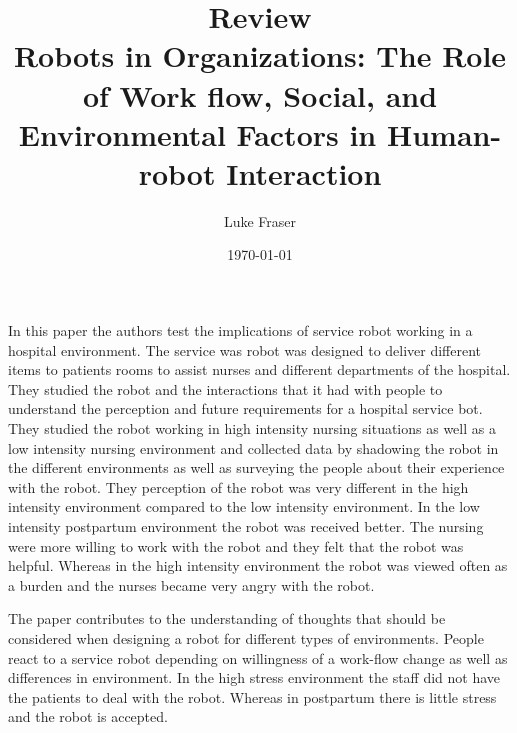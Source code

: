\documentclass{article}
\begin{document}
\title{{\large Review} \\ Robots in Organizations: The Role of Work flow, Social, and Environmental Factors in Human-robot Interaction}
\author{Luke Fraser}
\date{\today}
\maketitle

\begingroup
\renewcommand{\section}[2]{}


\endgroup

\section*{Summary}
In this paper the authors test the implications of service robot working in a hospital environment. The service was robot was designed to deliver different items to patients rooms to assist nurses and different departments of the hospital. They studied the robot and the interactions that it had with people to understand the perception and future requirements for a hospital service bot. They studied the robot working in high intensity nursing situations as well as a low intensity nursing environment and collected data by shadowing the robot in the different environments as well as surveying the people about their experience with the robot. They perception of the robot was very different in the high intensity environment compared to the low intensity environment. In the low intensity postpartum environment the robot was received better. The nursing were more willing to work with the robot and they felt that the robot was helpful. Whereas in the high intensity environment the robot was viewed often as a burden and the nurses became very angry with the robot.
\section*{Strengths}
The paper contributes to the understanding of thoughts that should be considered when designing a robot for different types of environments. People react to a service robot depending on willingness of a work-flow change as well as differences in environment. In the high stress environment the staff did not have the patients to deal with the robot. Whereas in postpartum there is little stress and the robot is accepted.
\end{document}
